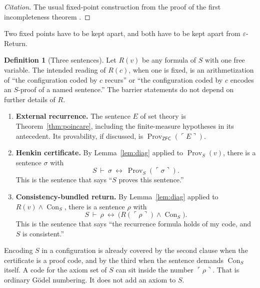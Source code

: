 \documentclass[11pt]{article}
\newcommand{\gn}[1]{\ulcorner #1 \urcorner}
\DeclareMathOperator{\Prov}{Prov}
\DeclareMathOperator{\Con}{Con}
\newcommand{\ZFC}{\mathsf{ZFC}}
\theoremstyle{definition}
\newtheorem{definition}[theorem]{Definition}
\theoremstyle{remark}
\begin{document}
\begin{proof}[Citation]
The usual fixed-point construction from the proof of the first incompleteness theorem \citep{godel1931,boolos1993}.
\end{proof}

Two fixed points have to be kept apart, and both have to be kept apart from \(\varepsilon\)-Return.

\begin{definition}[Three sentences]
\label{def:three}
Let \(R(v)\) be any formula of \(S\) with one free variable.
The intended reading of \(R(c)\), when one is fixed, is an arithmetization of ``the configuration coded by \(c\) recurs'' or ``the configuration coded by \(c\) encodes an \(S\)-proof of a named sentence.''
The barrier statements do not depend on further details of \(R\).
\begin{enumerate}
\item \textbf{External recurrence.}
The sentence \(E\) of set theory is Theorem~\ref{thm:poincare}, including the finite-measure hypotheses in its antecedent.
Its provability, if discussed, is \(\Prov_{\ZFC}(\gn{E})\).

\item \textbf{Henkin certificate.}
By Lemma~\ref{lem:diag} applied to \(\Prov_{S}(v)\), there is a sentence \(\sigma\) with
\begin{equation}
\label{eq:henkin}
S\ \vdash\ \sigma\ \leftrightarrow\ \Prov_{S}(\gn{\sigma}).
\end{equation}
This is the sentence that says ``\(S\) proves this sentence.''

\item \textbf{Consistency-bundled return.}
By Lemma~\ref{lem:diag} applied to \(R(v)\wedge\Con_{S}\), there is a sentence \(\rho\) with
\begin{equation}
\label{eq:bundled}
S\ \vdash\ \rho\ \leftrightarrow\ \bigl(R(\gn{\rho})\wedge\Con_{S}\bigr).
\end{equation}
This is the sentence that says ``the recurrence formula holds of my code, and \(S\) is consistent.''
\end{enumerate}
\end{definition}

Encoding \(S\) in a configuration is already covered by the second clause when the certificate is a proof code, and by the third when the sentence demands \(\Con_{S}\) itself.
A code for the axiom set of \(S\) can sit inside the number \(\gn{\rho}\).
That is ordinary G\"odel numbering.
It does not add an axiom to \(S\).
\end{document}
